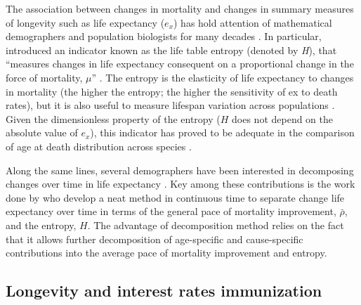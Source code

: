 \documentclass[12pt]{article}
\begin{document}
The association between changes in mortality and changes in summary measures of longevity such as life expectancy ($e_x$) has hold attention of mathematical demographers and population biologists for many decades \citep{leser1955variations,keyfitz1968introduction,keyfitz1977difference,demetrius1974demographic,mitra1978short,goldman1986new,Vaupel1986,hakkert1987life,fernandez2015entropy}. In particular, \citet{leser1955variations,demetrius1974demographic,keyfitz1977difference} introduced an indicator known as the life table entropy (denoted by \textit{H}), that  “measures changes in life expectancy consequent on a proportional change in the force of mortality, $\mu$” \citep{Keyfitz1985}. The entropy is the elasticity of life expectancy to changes in mortality (the higher the entropy; the higher the sensitivity of ex to death rates), but it is also useful to measure lifespan variation across populations \citep{vaupel2011life,aburto2019threshold,aburto2020dynamics}. Given the dimensionless property of the entropy ($H$ does not depend on the absolute value of $e_x$), this indicator has proved to be adequate in the comparison of age at death distribution across species \citep{baudisch2011pace,wrycza2015quantifying,colchero2016emergence}.


Along the same lines, several demographers have been interested in decomposing changes over time in life expectancy \citep{arriaga1984measuring,pollard1988decomposition,beltran2008integrated,beltran2011unifying}. Key among these contributions is the work done by \citet{Vaupel2003} who develop a neat method in continuous time to separate change life expectancy over time in terms of the general pace of mortality improvement, $\bar{\rho}$, and the entropy, $H$. The advantage of \citet{Vaupel2003} decomposition method relies on the fact that it allows further decomposition of age-specific and cause-specific contributions into the average pace of mortality improvement and entropy.


\subsection*{Longevity and interest rates immunization}
\end{document}
